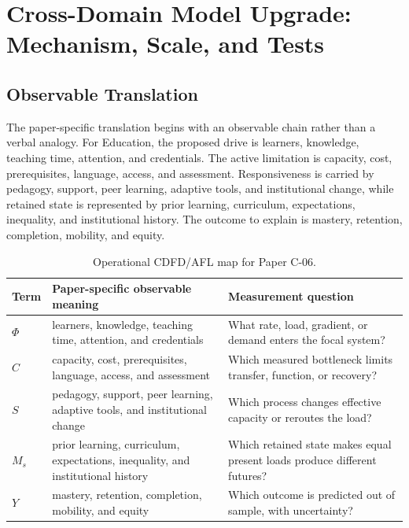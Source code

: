 \documentclass[11pt,a4paper]{article}
\begin{document}
\section{Cross-Domain Model Upgrade: Mechanism, Scale, and Tests}

\subsection{Observable Translation}

The paper-specific translation begins with an observable chain rather than a
verbal analogy. For Education, the proposed drive is learners, knowledge, teaching time, attention, and credentials.
The active limitation is capacity, cost, prerequisites, language, access, and assessment. Responsiveness is carried by
pedagogy, support, peer learning, adaptive tools, and institutional change, while retained state is represented by
prior learning, curriculum, expectations, inequality, and institutional history. The outcome to explain is mastery, retention, completion, mobility, and equity.

\begin{table}[htbp]
\centering
\small
\caption{Operational CDFD/AFL map for Paper C-06.}
\begin{tabularx}{\textwidth}{|l|X|X|}
\hline
\textbf{Term} & \textbf{Paper-specific observable meaning} & \textbf{Measurement question} \\
\hline
$\Phi$ & learners, knowledge, teaching time, attention, and credentials & What rate, load, gradient, or demand enters the focal system? \\
\hline
$C$ & capacity, cost, prerequisites, language, access, and assessment & Which measured bottleneck limits transfer, function, or recovery? \\
\hline
$S$ & pedagogy, support, peer learning, adaptive tools, and institutional change & Which process changes effective capacity or reroutes the load? \\
\hline
$M_s$ & prior learning, curriculum, expectations, inequality, and institutional history & Which retained state makes equal present loads produce different futures? \\
\hline
$Y$ & mastery, retention, completion, mobility, and equity & Which outcome is predicted out of sample, with uncertainty? \\
\hline
\end{tabularx}
\end{table}
\end{document}
